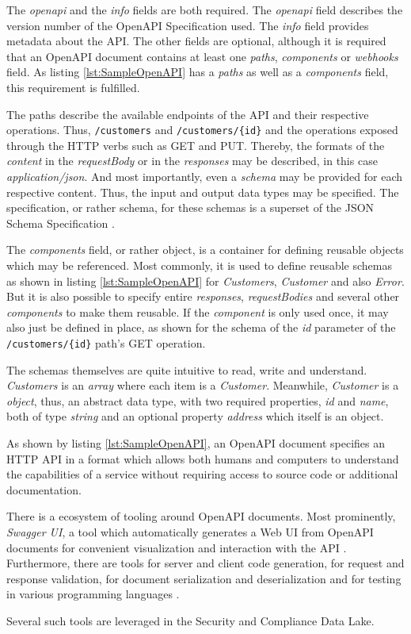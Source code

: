 The \emph{openapi} and the \emph{info} fields are both required. The \emph{openapi} field describes the version number of the OpenAPI Specification used. The \emph{info} field provides metadata about the API. The other fields are optional, although it is required that an OpenAPI document contains at least one \emph{paths}, \emph{components} or \emph{webhooks} field. As listing \ref{lst:SampleOpenAPI} has a \emph{paths} as well as a \emph{components} field, this requirement is fulfilled.\par
The paths describe the available endpoints of the API and their respective operations. Thus, \lstinline|/customers| and \lstinline|/customers/{id}| and the operations exposed through the HTTP verbs such as GET and PUT. Thereby, the formats of the \emph{content} in the \emph{requestBody} or in the \emph{responses} may be described, in this case \emph{application/json}. And most importantly, even a \emph{schema} may be provided for each respective content. Thus, the input and output data types may be specified. The specification, or rather schema, for these schemas is a superset of the JSON Schema Specification \cite{OpenAPISubset}.\par 
The \emph{components} field, or rather object, is a container for defining reusable objects which may be referenced. Most commonly, it is used to define reusable schemas as shown in listing \ref{lst:SampleOpenAPI} for \emph{Customers}, \emph{Customer} and also \emph{Error}. But it is also possible to specify entire \emph{responses}, \emph{requestBodies} and several other \emph{components} to make them reusable. If the \emph{component} is only used once, it may also just be defined in place, as shown for the schema of the \emph{id} parameter of the \lstinline|/customers/{id}| path's GET operation.\par
The schemas themselves are quite intuitive to read, write and understand. \emph{Customers} is an \emph{array} where each item is a \emph{Customer}. Meanwhile, \emph{Customer} is a \emph{object}, thus, an abstract data type, with two required properties, \emph{id} and \emph{name}, both of type \emph{string} and an optional property \emph{address} which itself is an object.\par
As shown by listing \ref{lst:SampleOpenAPI}, an OpenAPI document specifies an HTTP API in a format which allows both humans and computers to understand the capabilities of a service without requiring access to source code or additional documentation.\par
There is a ecosystem of tooling around OpenAPI documents. Most prominently, \emph{Swagger UI}, a tool which automatically generates a Web UI from OpenAPI documents for convenient visualization and interaction with the API \cite{SwaggerUI}. Furthermore, there are tools for server and client code generation, for request and response validation, for document serialization and deserialization and for testing in various programming languages \cite{OpenAPISubset}.\par
Several such tools are leveraged in the Security and Compliance Data Lake.\\

